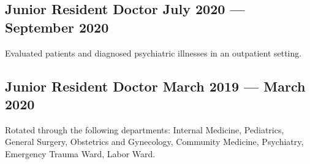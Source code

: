 \subsection{{Junior Resident Doctor \hfill July 2020 --- September 2020}}
\begin{zitemize}
\item Evaluated patients and diagnosed psychiatric illnesses in an outpatient setting.
\end{zitemize}

\subsection{{Junior Resident Doctor \hfill March 2019 --- March 2020}}
\begin{zitemize}
\item Rotated through the following departments: Internal Medicine, Pediatrics, General Surgery, Obstetrics and Gynecology, Community Medicine, Psychiatry, Emergency Trauma Ward, Labor Ward.
\end{zitemize}